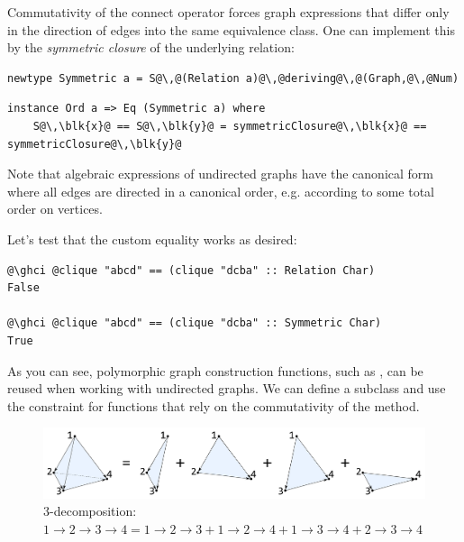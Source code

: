 Commutativity of the connect operator forces graph expressions that differ only
in the direction of edges into the same equivalence class. One can implement
this by the \emph{symmetric closure} of the underlying relation:

\begin{verbatim}
newtype Symmetric a = S@\,@(Relation a)@\,@deriving@\,@(Graph,@\,@Num)
\end{verbatim}
\vspace{1mm}
\begin{verbatim}
instance Ord a => Eq (Symmetric a) where
    S@\,\blk{x}@ == S@\,\blk{y}@ = symmetricClosure@\,\blk{x}@ == symmetricClosure@\,\blk{y}@
\end{verbatim}

Note that algebraic expressions of undirected graphs have the canonical form where all
edges are directed in a canonical order, e.g. according to some total order on vertices.

Let's test that the custom equality works as desired:

\begin{verbatim}
@\ghci @clique "abcd" == (clique "dcba" :: Relation Char)
False

@\ghci @clique "abcd" == (clique "dcba" :: Symmetric Char)
True
\end{verbatim}

As you can see, polymorphic graph construction functions, such as ,
can be reused when working with undirected graphs. We can define a subclass
 and use the
constraint for functions that rely on the commutativity of the  method.

\begin{figure}
\centerline{\includegraphics[scale=0.12]{fig/3-decomposition.pdf}}
\caption{3-decomposition:
    $1 \rightarrow 2 \rightarrow 3 \rightarrow 4 =
    1 \rightarrow 2 \rightarrow 3 + 1 \rightarrow 2 \rightarrow 4 +
    1 \rightarrow 3 \rightarrow 4 + 2 \rightarrow 3 \rightarrow 4$
    \label{fig-3-decomposition}}
\end{figure}

